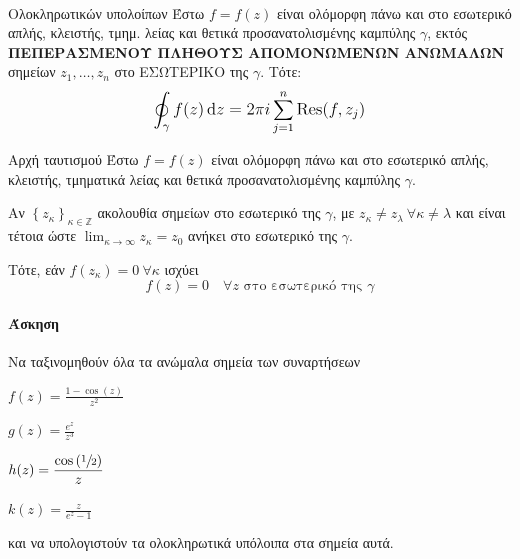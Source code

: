 \documentclass[12pt,a4paper,notitlepage,fleqn]{article}
\begin{document}
    \paragraph{}
    \begin{theorem*}[colbacktitle=red!35!black]{Ολοκληρωτικών υπολοίπων}
    	Έστω \( f = f(z) \) είναι ολόμορφη πάνω και στο εσωτερικό απλής, κλειστής, τμημ.
        λείας και θετικά προσανατολισμένης καμπύλης \( \gamma \), εκτός
        \textbf{ΠΕΠΕΡΑΣΜΕΝΟΥ ΠΛΗΘΟΥΣ ΑΠΟΜΟΝΩΜΕΝΩΝ ΑΝΩΜΑΛΩΝ} σημείων \( z_1,\dots,z_n \)
        στο ΕΣΩΤΕΡΙΚΟ της \( \gamma \). Τότε:
        \[
        \mathlarger{\oint_\gamma f(z) \dif z = 2\pi i \sum_{j=1}^n \Res(f,z_j)}
        \]
    \end{theorem*}

    \begin{theorem*}[colbacktitle=red!35!black]{Αρχή ταυτισμού}
       	Έστω \( f = f(z) \) είναι ολόμορφη πάνω και στο εσωτερικό απλής, κλειστής, τμηματικά
       	λείας και θετικά προσανατολισμένης καμπύλης \( \gamma \).

       	Αν \( \left\lbrace z_\kappa \right\rbrace_{\kappa \in \mathbb Z} \) ακολουθία
       	σημείων στο εσωτερικό της \( \gamma \), με \( z_\kappa \neq z_\lambda \
       	\forall \kappa \neq \lambda \) και είναι τέτοια ώστε
       	\( \displaystyle
       	\lim_{\kappa \to \infty} z_\kappa = z_0\) ανήκει στο εσωτερικό της \( \gamma \).

       	Τότε, εάν \( f(z_\kappa) = 0 \ \forall \kappa \) ισχύει
       	\[
       	f(z) = 0 \quad \forall z \text{ στο εσωτερικό της } \gamma
       	\]
    \end{theorem*}

    \paragraph{Άσκηση}
    Να ταξινομηθούν όλα τα ανώμαλα σημεία των συναρτήσεων
    \begin{enumlatin}
    	\item \( \displaystyle f(z) = \frac{1-\cos(z)}{z^2} \)
    	\item \( \displaystyle g(z) = \frac{e^z}{z^3} \)
    	\item \( \displaystyle h(z) =
    	\frac{\cos\left(\sfrac{1}{2} \right)}{z} \)
    	\item \( \displaystyle k(z) = \frac{z}{e^z-1} \)
    \end{enumlatin}
    και να υπολογιστούν τα ολοκληρωτικά υπόλοιπα στα σημεία αυτά.
\end{document}
